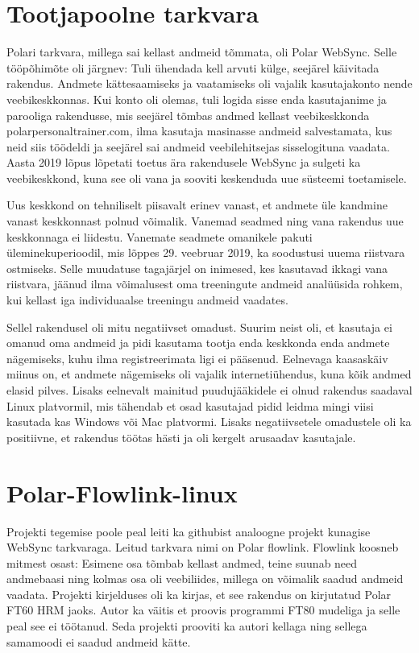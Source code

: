 
\section{Tootjapoolne tarkvara}\label{sec:tootja-soft}
Polari tarkvara, millega sai kellast andmeid tõmmata, oli Polar WebSync.
Selle tööpõhimõte oli järgnev:
Tuli ühendada kell arvuti külge, seejärel käivitada rakendus.
Andmete kättesaamiseks ja vaatamiseks oli vajalik kasutajakonto nende veebikeskkonnas.
Kui konto oli olemas, tuli logida sisse enda kasutajanime ja parooliga rakendusse, mis seejärel tõmbas andmed kellast veebikeskkonda polarpersonaltrainer.com, ilma kasutaja masinasse andmeid salvestamata, kus neid siis töödeldi ja seejärel sai andmeid veebilehitsejas sisselogituna vaadata. 
Aasta 2019 lõpus lõpetati toetus ära rakendusele WebSync ja sulgeti ka veebikeskkond, kuna see oli vana ja sooviti keskenduda uue süsteemi toetamisele.\cite{polar-ws-discontinued}

Uus keskkond on tehniliselt piisavalt erinev vanast, et andmete üle kandmine vanast keskkonnast polnud võimalik.
Vanemad seadmed ning vana rakendus uue keskkonnaga ei liidestu.
Vanemate seadmete omanikele pakuti üleminekuperioodil, mis lõppes 29. veebruar 2019, ka soodustusi uuema riistvara ostmiseks.\cite{polar-ws-discontinued}
Selle muudatuse tagajärjel on inimesed, kes kasutavad ikkagi vana riistvara, jäänud ilma võimalusest oma treeningute andmeid analüüsida rohkem, kui kellast iga individuaalse treeningu andmeid vaadates.

Sellel rakendusel oli mitu negatiivset omadust.
Suurim neist oli, et kasutaja ei omanud oma andmeid ja pidi kasutama tootja enda keskkonda enda andmete nägemiseks, kuhu ilma registreerimata ligi ei pääsenud.
Eelnevaga kaasaskäiv miinus on, et andmete nägemiseks oli vajalik internetiühendus, kuna kõik andmed elasid pilves.
Lisaks eelnevalt mainitud puudujääkidele ei olnud rakendus saadaval Linux platvormil, mis tähendab et osad kasutajad pidid leidma mingi viisi kasutada kas Windows või Mac platvormi.
Lisaks negatiivsetele omadustele oli ka positiivne, et rakendus töötas hästi ja oli kergelt arusaadav kasutajale.


\section{Polar-Flowlink-linux}\label{sec:flowlink}
Projekti tegemise poole peal leiti ka githubist analoogne projekt kunagise WebSync tarkvaraga.
Leitud tarkvara nimi on Polar flowlink.
Flowlink koosneb mitmest osast:
Esimene osa tõmbab kellast andmed, teine suunab need andmebaasi ning kolmas osa oli veebiliides, millega on võimalik saadud andmeid vaadata.
Projekti kirjelduses oli ka kirjas, et see rakendus on kirjutatud Polar FT60 HRM jaoks.
Autor ka väitis et proovis programmi FT80 mudeliga ja selle peal see ei töötanud.
Seda projekti prooviti ka autori kellaga ning sellega samamoodi ei saadud andmeid kätte.

